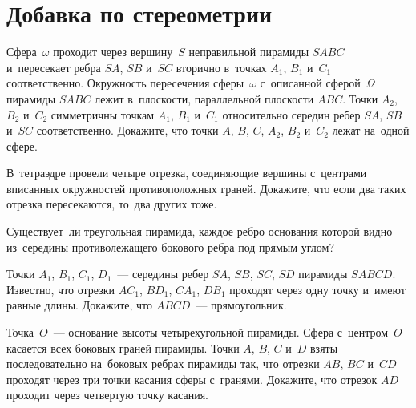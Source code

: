 
\section*{Добавка по стереометрии}


\begin{problems}

\item
Сфера~$\omega$ проходит через вершину~$S$ неправильной пирамиды $SABC$
и~пересекает ребра $SA$, $SB$ и~$SC$ вторично в~точках $A_1$, $B_1$ и~$C_1$
соответственно.
Окружность пересечения сферы~$\omega$ с~описанной сферой~$\Omega$ пирамиды
$SABC$ лежит в~плоскости, параллельной плоскости $ABC$.
Точки $A_2$, $B_2$ и~$C_2$ симметричны точкам $A_1$, $B_1$ и~$C_1$ относительно
середин ребер $SA$, $SB$ и~$SC$ соответственно.
Докажите, что точки $A$, $B$, $C$, $A_2$, $B_2$ и~$C_2$ лежат на~одной сфере.

\item
В~тетраэдре провели четыре отрезка, соединяющие вершины с~центрами вписанных
окружностей противоположных граней.
Докажите, что если два таких отрезка пересекаются, то~два других тоже.

\item
Существует~ли треугольная пирамида, каждое ребро основания которой видно
из~середины противолежащего бокового ребра под прямым углом?

\item
Точки $A_1$, $B_1$, $C_1$, $D_1$~— середины ребер $SA$, $SB$, $SC$, $SD$
пирамиды $SABCD$.
Известно, что отрезки $A C_1$, $B D_1$, $C A_1$, $D B_1$ проходят через одну
точку и~имеют равные длины.
Докажите, что $ABCD$~— прямоугольник.

\item
Точка~$O$~— основание высоты четырехугольной пирамиды.
Сфера с~центром~$O$ касается всех боковых граней пирамиды.
Точки $A$, $B$, $C$ и~$D$ взяты последовательно на~боковых ребрах пирамиды так,
что отрезки $AB$, $BC$ и~$CD$ проходят через три точки касания сферы с~гранями.
Докажите, что отрезок $AD$ проходит через четвертую точку касания.

\end{problems}

